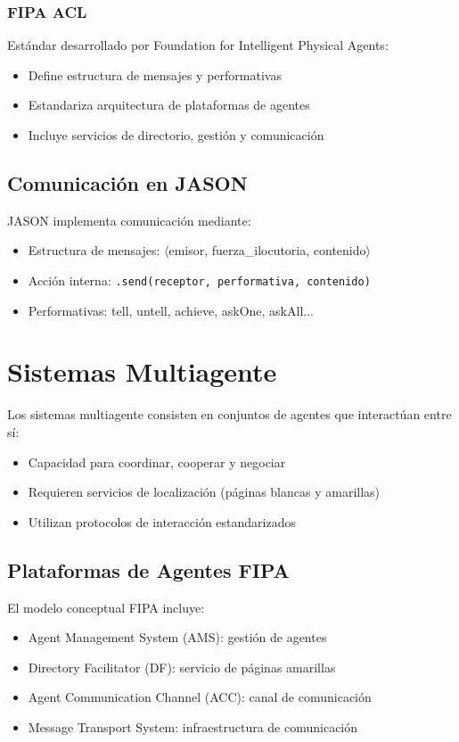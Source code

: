 \subsubsection{FIPA ACL}
Estándar desarrollado por Foundation for Intelligent Physical Agents:
\begin{itemize}
    \item Define estructura de mensajes y performativas
    \item Estandariza arquitectura de plataformas de agentes
    \item Incluye servicios de directorio, gestión y comunicación
\end{itemize}

\subsection{Comunicación en JASON}
JASON implementa comunicación mediante:
\begin{itemize}
    \item Estructura de mensajes: $\langle$emisor, fuerza\_ilocutoria, contenido$\rangle$
    \item Acción interna: \texttt{.send(receptor, performativa, contenido)}
    \item Performativas: tell, untell, achieve, askOne, askAll...
\end{itemize}

\section{Sistemas Multiagente}

Los sistemas multiagente consisten en conjuntos de agentes que interactúan entre sí:
\begin{itemize}
    \item Capacidad para coordinar, cooperar y negociar
    \item Requieren servicios de localización (páginas blancas y amarillas)
    \item Utilizan protocolos de interacción estandarizados
\end{itemize}

\subsection{Plataformas de Agentes FIPA}
El modelo conceptual FIPA incluye:
\begin{itemize}
    \item Agent Management System (AMS): gestión de agentes
    \item Directory Facilitator (DF): servicio de páginas amarillas
    \item Agent Communication Channel (ACC): canal de comunicación
    \item Message Transport System: infraestructura de comunicación
\end{itemize}